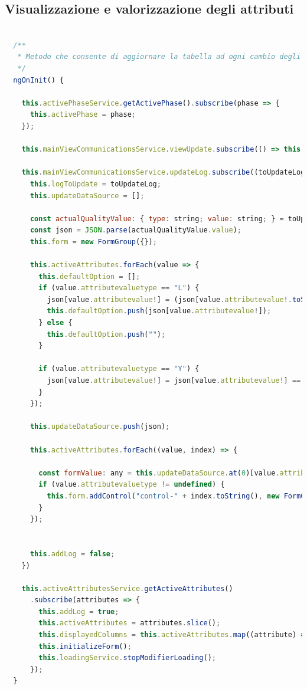 \subsection*{Visualizzazione e valorizzazione degli attributi}
\begin{lstlisting}[language=JavaScript, caption={Aggiornamento della tabella di aggiunta / modifica dei dati di controllo qualità}]

  /**
   * Metodo che consente di aggiornare la tabella ad ogni cambio degli attributi attivi (avviene quando si aggiorna la fase attiva)
   */
  ngOnInit() {

    this.activePhaseService.getActivePhase().subscribe(phase => {
      this.activePhase = phase;
    });

    this.mainViewCommunicationsService.viewUpdate.subscribe(() => this.clearDialog())

    this.mainViewCommunicationsService.updateLog.subscribe((toUpdateLog) => {
      this.logToUpdate = toUpdateLog;
      this.updateDataSource = [];

      const actualQualityValue: { type: string; value: string; } = toUpdateLog.qualityvalue! as any;
      const json = JSON.parse(actualQualityValue.value);
      this.form = new FormGroup({});

      this.activeAttributes.forEach(value => {
        this.defaultOption = [];
        if (value.attributevaluetype == "L") {
          json[value.attributevalue!] = (json[value.attributevalue!.toString() + '_id' as any] + " - " + json[value.attributevalue! as any]);
          this.defaultOption.push(json[value.attributevalue!]);
        } else {
          this.defaultOption.push("");
        }

        if (value.attributevaluetype == "Y") {
          json[value.attributevalue!] = json[value.attributevalue!] == "true";
        }
      });

      this.updateDataSource.push(json);

      this.activeAttributes.forEach((value, index) => {

        const formValue: any = this.updateDataSource.at(0)[value.attributevalue!];
        if (value.attributevaluetype != undefined) {
          this.form.addControl("control-" + index.toString(), new FormControl(formValue, Validators.required));
        }
      });


      this.addLog = false;
    })

    this.activeAttributesService.getActiveAttributes()
      .subscribe(attributes => {
        this.addLog = true;
        this.activeAttributes = attributes.slice();
        this.displayedColumns = this.activeAttributes.map((attribute) => attribute.attributevalue!);
        this.initializeForm();
        this.loadingService.stopModifierLoading();
      });
  }
\end{lstlisting}

